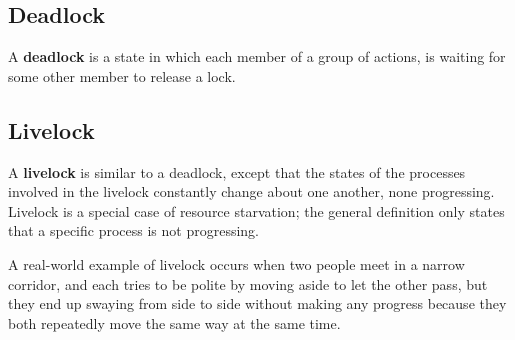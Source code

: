 \documentclass[../main]{subfiles}
\begin{document}
\subsection{Deadlock}
    A \textbf{deadlock} is a state in which each member of a group of actions, is waiting for some other member to release a lock.

\subsection{Livelock}
    A \textbf{livelock} is similar to a deadlock, except that the states of the processes involved in the livelock constantly change about one another,
none progressing. Livelock is a special case of resource starvation; the general definition only states that a specific process is not progressing.\newline

    A real-world example of livelock occurs when two people meet in a narrow corridor, and each tries to be polite by moving aside to let the other pass,
but they end up swaying from side to side without making any progress because they both repeatedly move the same way at the same time.
\end{document}
